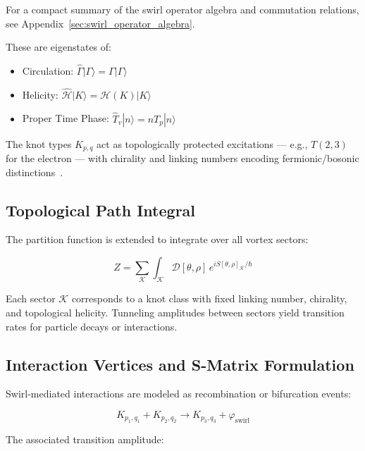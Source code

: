 \documentclass[12pt]{article}
\begin{document}
    For a compact summary of the swirl operator algebra and commutation relations, see Appendix~\ref{sec:swirl_operator_algebra}.

    These are eigenstates of:

    \begin{itemize}
        \item Circulation: \( \hat{\Gamma} | \Gamma \rangle = \Gamma | \Gamma \rangle \)
        \item Helicity: \( \hat{\mathcal{H}} | K \rangle = \mathcal{H}(K) | K \rangle \)
        \item Proper Time Phase: \( \hat{T}_v | n \rangle = n T_p | n \rangle \)
    \end{itemize}

    The knot types \( K_{p,q} \) act as topologically protected excitations — e.g., \( T(2,3) \) for the electron — with chirality and linking numbers encoding fermionic/bosonic distinctions~\cite{kleckner2013creation}.

    \subsection{Topological Path Integral}

    The partition function is extended to integrate over all vortex sectors:

    \begin{equation}
    Z = \sum_{\mathcal{K}} \int_{\mathcal{K}} \mathcal{D}[\theta, \rho] \, e^{i S[\theta, \rho]_{\mathcal{K}} / \hbar}
    \end{equation}

    Each sector \( \mathcal{K} \) corresponds to a knot class with fixed linking number, chirality, and topological helicity. Tunneling amplitudes between sectors yield transition rates for particle decays or interactions.

    \subsection{Interaction Vertices and S-Matrix Formulation}

    Swirl-mediated interactions are modeled as recombination or bifurcation events:

    \begin{equation}
    K_{p_1,q_1} + K_{p_2,q_2} \rightarrow K_{p_3,q_3} + \varphi_{\text{swirl}}
    \end{equation}

    The associated transition amplitude:
\end{document}
